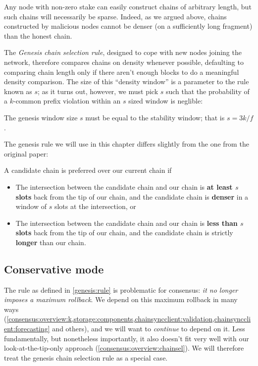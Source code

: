 Any node with non-zero stake can easily construct chains of arbitrary length,
but such chains will necessarily be sparse. Indeed, as we argued above,
chains constructed by malicious nodes cannot be denser (on a sufficiently
long fragment) than the honest chain.

The \emph{Genesis chain selection rule}, designed to cope with new nodes joining
the network, therefore compares chains on density whenever possible, defaulting
to comparing chain length only if there aren't enough blocks to do a meaningful
density comparison. The size of this ``density window'' is a parameter to the
rule known as $s$; as it turns out, however, we must pick $s$ such that the
probability of a $k$-common prefix violation within an $s$ sized window is
neglible:\VerifiedByResearchers{}

\begin{definition}
\label{default-genesis-window}
The genesis window size $s$ must be equal to the stability window;
that is $s = 3k / f$.
\end{definition}

The genesis rule we will use in this chapter differs slightly from the one from
the original paper:

\begin{definition}
\label{genesis:rule}
A candidate chain is preferred over our current chain if

\begin{itemize}
\item The intersection between the candidate chain and our chain is \textbf{at
least $s$ slots} back from the tip of our chain, and the candidate chain is
\textbf{denser} in a window of $s$ slots at the intersection, or

\item The intersection between the candidate chain and our chain is \textbf{less
than $s$ slots} back from the tip of our chain, and the candidate chain is
strictly \textbf{longer} than our chain.
\end{itemize}

\end{definition}

\subsection{Conservative mode}
\label{genesis:intro:conservative}

The rule as defined in \cref{genesis:rule} is problematic for consensus:
\emph{it no longer imposes a maximum rollback}. We depend on this maximum
rollback in many ways
(\cref{consensus:overview:k,storage:components,chainsyncclient:validation,chainsyncclient:forecasting}
and others), and we will want to \emph{continue} to depend on it. Less
fundamentally, but nonetheless importantly, it also doesn't fit very well with
our look-at-the-tip-only approach (\cref{consensus:overview:chainsel}). We will
therefore treat the genesis chain selection rule as a special case.

